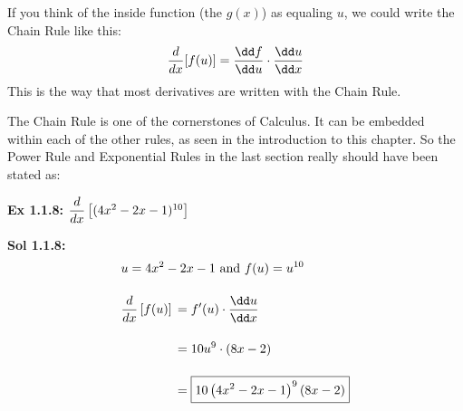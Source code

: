 \begin{center}
\end{center}

If you think of the inside function (the $g(x)$) as equaling $u$, we could write the Chain Rule like this: \begin{align*}
    \diff [f(u)] = \dfrac{\dd f}{\dd u} \cdot \dfrac{\dd u}{\dd x}
\end{align*}
This is the way that most derivatives are written with the Chain Rule. \par

The Chain Rule is one of the cornerstones of Calculus. It can be embedded within each of the other rules, as seen in the introduction to this chapter. So the Power Rule and Exponential Rules in the last section really should have been stated as: 


\begin{tcolorbox}[example]
    \textbf{Ex 1.1.8: } $\dfrac{d}{dx} \left[(4x^2 - 2x - 1)^{10}\right]$ 
\end{tcolorbox}
\begin{tcolorbox}[solution]
    \textbf{Sol 1.1.8: } \begin{align*}
        & u = 4x^2 - 2x - 1 \text{ and } f(u) = u^{10} \\[11pt]
        & \diff \left[f(u)\right] \begin{aligned}[t]
            & = f'(u) \cdot \dfrac{\dd u}{\dd x} \\[11pt] 
            & = 10u^9 \cdot \left(8x - 2\right) \\[11pt]
            & = \boxed{10\left(4x^2 - 2x - 1\right)^9(8x - 2)} 
        \end{aligned}
    \end{align*}
\end{tcolorbox} \vspace{11pt}

